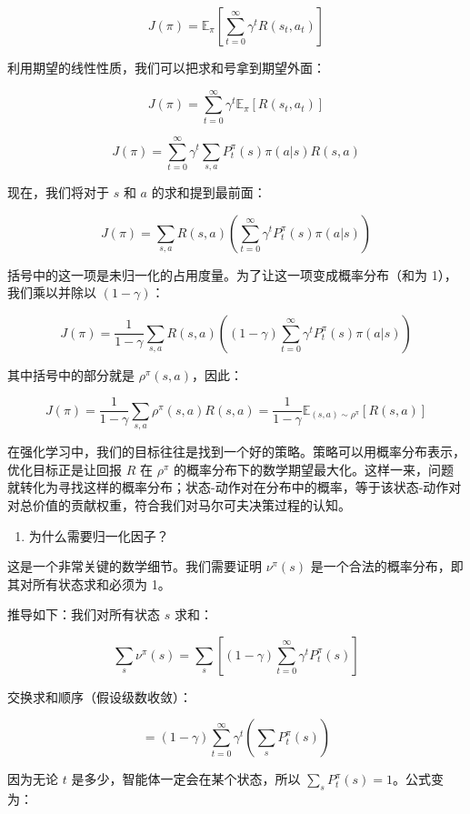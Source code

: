 \[
J(\pi) = \mathbb{E}_\pi\left[\sum_{t=0}^{\infty}\gamma^t R(s_t,a_t)\right]
\]

利用期望的线性性质，我们可以把求和号拿到期望外面：

\[
J(\pi) = \sum_{t=0}^{\infty}\gamma^t\mathbb{E}_\pi[R(s_t,a_t)]
\]

\[
J(\pi) = \sum_{t=0}^{\infty}\gamma^t\sum_{s,a}P_t^\pi(s)\pi(a|s)R(s,a)
\]

现在，我们将对于 \(s\) 和 \(a\) 的求和提到最前面：

\[
J(\pi) = \sum_{s,a}R(s,a)\left(\sum_{t=0}^{\infty}\gamma^t P_t^\pi(s)\pi(a|s)\right)
\]

括号中的这一项是未归一化的占用度量。为了让这一项变成概率分布（和为 1），我们乘以并除以 \((1-\gamma)\)：

\[
J(\pi) = \frac{1}{1-\gamma}\sum_{s,a}R(s,a)\left((1-\gamma)\sum_{t=0}^{\infty}\gamma^t P_t^\pi(s)\pi(a|s)\right)
\]

其中括号中的部分就是 \(\rho^\pi(s,a)\)，因此：

\[
J(\pi) = \frac{1}{1-\gamma}\sum_{s,a}\rho^\pi(s,a)R(s,a) = \frac{1}{1-\gamma}\mathbb{E}_{(s,a)\sim\rho^\pi}[R(s,a)]
\]

在强化学习中，我们的目标往往是找到一个好的策略。策略可以用概率分布表示，优化目标正是让回报 \(R\) 在 \(\rho^\pi\) 的概率分布下的数学期望最大化。这样一来，问题就转化为寻找这样的概率分布；状态-动作对在分布中的概率，等于该状态-动作对对总价值的贡献权重，符合我们对马尔可夫决策过程的认知。

\begin{enumerate}
\def\labelenumi{\arabic{enumi}.}
\setcounter{enumi}{1}
\tightlist
\item
  为什么需要归一化因子？
\end{enumerate}

这是一个非常关键的数学细节。我们需要证明 \(\nu^\pi(s)\) 是一个合法的概率分布，即其对所有状态求和必须为 1。

推导如下：我们对所有状态 \(s\) 求和：

\[
\sum_s \nu^\pi(s) = \sum_s\left[(1-\gamma)\sum_{t=0}^{\infty}\gamma^t P_t^\pi(s)\right]
\]

交换求和顺序（假设级数收敛）：

\[
= (1-\gamma)\sum_{t=0}^{\infty}\gamma^t\left(\sum_s P_t^\pi(s)\right)
\]

因为无论 \(t\) 是多少，智能体一定会在某个状态，所以 \(\sum_s P_t^\pi(s)=1\)。公式变为：


